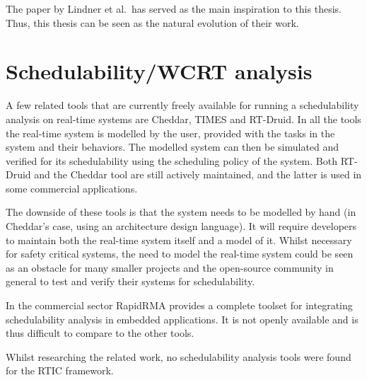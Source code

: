 The paper by Lindner et al.\ has served as the main inspiration to this thesis.
Thus, this thesis can be seen as the natural evolution of their work.

\section{Schedulability/WCRT analysis}
A few related tools that are currently freely available for running a
schedulability analysis on real-time systems are Cheddar\cite{cheddar},
TIMES\cite{timestool} and RT-Druid\cite{rtdruid}. In all the tools the
real-time system is modelled by the user, provided with the tasks in the system
and their behaviors. The modelled system can then be simulated and verified
for its schedulability using the scheduling policy of the system. Both RT-Druid
and the Cheddar tool are still actively maintained, and the latter is used in
some commercial applications\cite{ellidiss}.

The downside of these tools is that the system needs to be modelled by hand
(in Cheddar's case, using an architecture design language). It will require
developers to maintain both the real-time system itself and a model of it.
Whilst necessary for safety critical systems, the need to model the real-time
system could be seen as an obstacle for many smaller projects and the
open-source community in general to test and verify their systems for
schedulability.

In the commercial sector RapidRMA\cite{rapidrma} provides a complete toolset
for integrating schedulability analysis in embedded applications. It is not
openly available and is thus difficult to compare to the other tools.

Whilst researching the related work, no schedulability analysis tools were
found for the RTIC framework.
